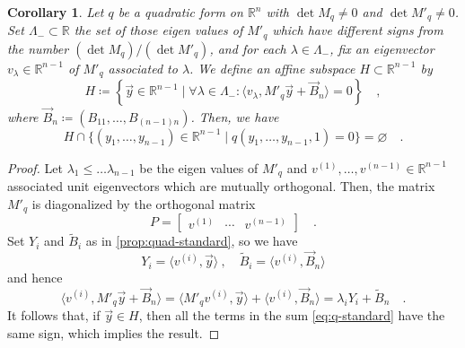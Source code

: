 \documentclass[pdftex,a4paper,12pt]{scrartcl}
\theoremstyle{plain}
\newtheorem{corollary}[theorem]{Corollary}
\theoremstyle{definition}
\theoremstyle{remark}
\begin{document}
\begin{corollary}
Let $q$ be a quadratic form on $\mathbb R^n$ with $\det M_q\neq 0$ and $\det M'_q\neq 0$.
Set $\Lambda_-\subset\mathbb R$ the set of those eigen values of $M'_q$ which have different signs from the number $(\det M_q)/(\det M'_q)$, and for each $\lambda\in\Lambda_-$, fix an eigenvector $v_\lambda\in\mathbb R^{n-1}$ of $M'_q$ associated to $\lambda$.
We define an affine subspace $H\subset\mathbb R^{n-1}$ by
\[
H
\coloneqq\left\{
\vec y\in\mathbb R^{n-1}\mid \forall\lambda\in\Lambda_-:\langle v_\lambda,M'_q\vec y+\vec B_n\rangle=0
\right\}
\quad,
\]
where $\vec B_n \coloneqq (B_{11},\dots,B_{(n-1)n})$.
Then, we have
\[
H\cap\{(y_1,\dots,y_{n-1})\in\mathbb R^{n-1}\mid q(y_1,\dots,y_{n-1},1)=0\}
= \varnothing
\quad.
\]
\end{corollary}
\begin{proof}
Let $\lambda_1\le\dots\lambda_{n-1}$ be the eigen values of $M'_q$ and $v^{(1)},\dots,v^{(n-1)}\in\mathbb R^{n-1}$ associated unit eigenvectors which are mutually orthogonal.
Then, the matrix $M'_q$ is diagonalized by the orthogonal matrix
\[
P =
\begin{bmatrix}
v^{(1)} & \cdots & v^{(n-1)}
\end{bmatrix}
\quad.
\]
Set $Y_i$ and $\widetilde B_i$ as in \cref{prop:quad-standard}, so we have
\[
Y_i = \langle v^{(i)},\vec y\rangle
\ ,\quad \widetilde B_i = \langle v^{(i)},\vec B_n\rangle
\]
and hence
\[
\langle v^{(i)},M'_q\vec y + \vec B_n\rangle
= \langle M'_q v^{(i)},\vec y\rangle + \langle v^{(i)},\vec B_n\rangle
= \lambda_i Y_i + \widetilde B_n
\quad.
\]
It follows that, if $\vec y\in H$, then all the terms in the sum \eqref{eq:q-standard} have the same sign, which implies the result.
\end{proof}
\end{document}
